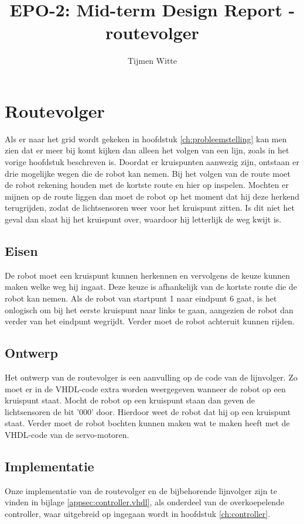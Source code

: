 \documentclass{report}
\title{EPO-2: Mid-term Design Report - routevolger}
\author{Tijmen Witte}
\begin{document}
\chapter{Routevolger}
\label{ch:routevolger}

Als er naar het grid wordt gekeken in hoofdstuk \ref{ch:probleemstelling} kan men zien dat er meer bij komt kijken dan alleen het volgen van een lijn, zoals in het vorige hoofdstuk beschreven is.
Doordat er kruispunten aanwezig zijn, ontstaan er drie mogelijke wegen die de robot kan nemen.
Bij het volgen van de route moet de robot rekening houden met de kortste route en hier op inspelen.
Mochten er mijnen op de route liggen dan moet de robot op het moment dat hij deze herkend terugrijden, zodat de lichtsensoren weer voor het kruispunt zitten.
Is dit niet het geval dan slaat hij het kruispunt over, waardoor hij letterlijk de weg kwijt is.

\section{Eisen}
De robot moet een kruispunt kunnen herkennen en vervolgens de keuze kunnen maken welke weg hij ingaat.
Deze keuze is afhankelijk van de kortste route die de robot kan nemen.
Als de robot van startpunt 1 naar eindpunt 6 gaat, is het onlogisch om bij het eerste kruispunt naar links te gaan, aangezien de robot dan verder van het eindpunt wegrijdt.
Verder moet de robot achteruit kunnen rijden.

\section{Ontwerp}
Het ontwerp van de routevolger is een aanvulling op de code van de lijnvolger.
Zo moet er in de VHDL-code extra worden weergegeven wanneer de robot op een kruispunt staat.
Mocht de robot op een kruispunt staan dan geven de lichtsensoren de bit '000' door. Hierdoor weet de robot dat hij op een kruispunt staat.
Verder moet de robot bochten kunnen maken wat te maken heeft met de VHDL-code van de servo-motoren.

\section{Implementatie}
Onze implementatie van de routevolger en de bijbehorende lijnvolger zijn te vinden in bijlage \ref{appsec:controller.vhdl}, als onderdeel van de overkoepelende controller, waar uitgebreid op ingegaan wordt in hoofdstuk \ref{ch:controller}.
\end{document}
